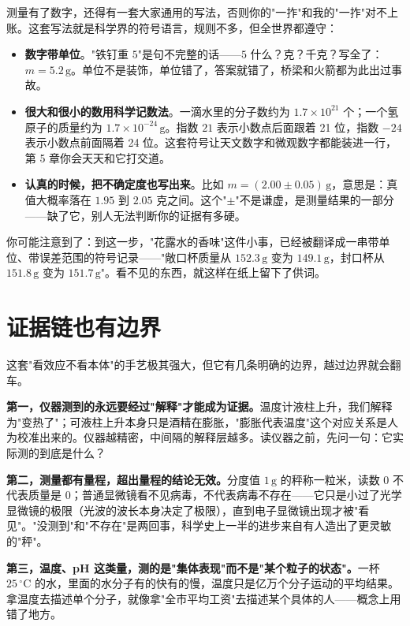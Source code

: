测量有了数字，还得有一套大家通用的写法，否则你的"一拃"和我的"一拃"对不上账。这套写法就是科学界的符号语言，规则不多，但全世界都遵守：

\begin{itemize}[itemsep=2pt]
\item \textbf{数字带单位}。"铁钉重 $5$"是句不完整的话——$5$ 什么？克？千克？写全了：$m = 5.2\,\mathrm{g}$。单位不是装饰，单位错了，答案就错了，桥梁和火箭都为此出过事故。
\item \textbf{很大和很小的数用科学记数法}。一滴水里的分子数约为 $1.7\times 10^{21}$ 个；一个氢原子的质量约为 $1.7\times 10^{-24}\,\mathrm{g}$。指数 $21$ 表示小数点后面跟着 21 位，指数 $-24$ 表示小数点前面隔着 24 位。这套符号让天文数字和微观数字都能装进一行，第 5 章你会天天和它打交道。
\item \textbf{认真的时候，把不确定度也写出来}。比如 $m = (2.00 \pm 0.05)\,\mathrm{g}$，意思是：真值大概率落在 $1.95$ 到 $2.05$ 克之间。这个"$\pm$"不是谦虚，是测量结果的一部分——缺了它，别人无法判断你的证据有多硬。
\end{itemize}

你可能注意到了：到这一步，"花露水的香味"这件小事，已经被翻译成一串带单位、带误差范围的符号记录——"敞口杯质量从 $152.3\,\mathrm{g}$ 变为 $149.1\,\mathrm{g}$，封口杯从 $151.8\,\mathrm{g}$ 变为 $151.7\,\mathrm{g}$"。看不见的东西，就这样在纸上留下了供词。

\section{证据链也有边界}

这套"看效应不看本体"的手艺极其强大，但它有几条明确的边界，越过边界就会翻车。

\textbf{第一，仪器测到的永远要经过"解释"才能成为证据。}温度计液柱上升，我们解释为"变热了"；可液柱上升本身只是酒精在膨胀，"膨胀代表温度"这个对应关系是人为校准出来的。仪器越精密，中间隔的解释层越多。读仪器之前，先问一句：它实际测的到底是什么？

\textbf{第二，测量都有量程，超出量程的结论无效。}分度值 $1\,\mathrm{g}$ 的秤称一粒米，读数 $0$ 不代表质量是 $0$；普通显微镜看不见病毒，不代表病毒不存在——它只是小过了光学显微镜的极限（光波的波长本身决定了极限），直到电子显微镜出现才被"看见"。"没测到"和"不存在"是两回事，科学史上一半的进步来自有人造出了更灵敏的"秤"。

\textbf{第三，温度、pH 这类量，测的是"集体表现"而不是"某个粒子的状态"。}一杯 $25\,^{\circ}\mathrm{C}$ 的水，里面的水分子有的快有的慢，温度只是亿万个分子运动的平均结果。拿温度去描述单个分子，就像拿"全市平均工资"去描述某个具体的人——概念上用错了地方。

